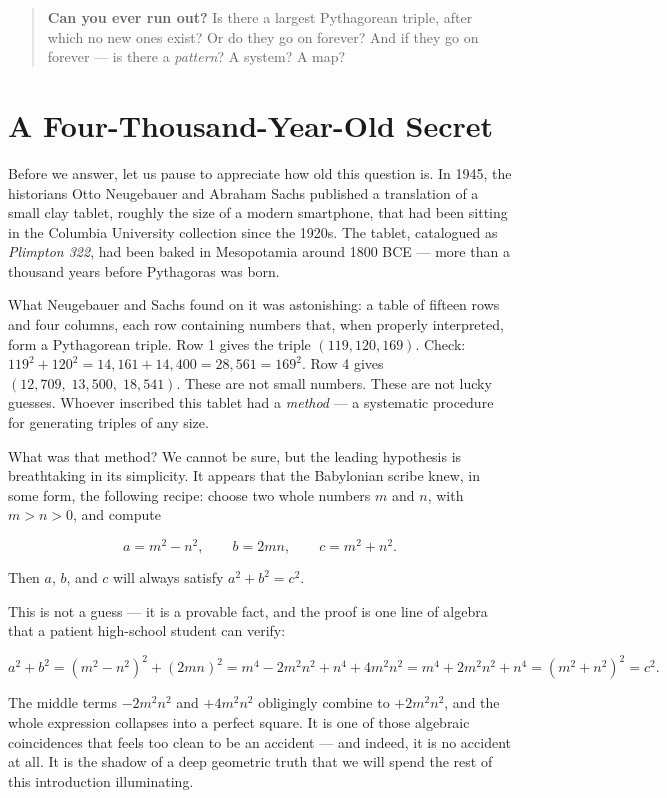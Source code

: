 \begin{quote}
\textbf{Can you ever run out?} Is there a largest Pythagorean triple, after which no new ones exist? Or do they go on forever? And if they go on forever --- is there a \emph{pattern}? A system? A map?
\end{quote}



\section{A Four-Thousand-Year-Old Secret}\label{intro-a-four-thousand-year-old-secret}

Before we answer, let us pause to appreciate how old this question is. In 1945, the historians Otto Neugebauer and Abraham Sachs published a translation of a small clay tablet, roughly the size of a modern smartphone, that had been sitting in the Columbia University collection since the 1920s. The tablet, catalogued as \emph{Plimpton 322}, had been baked in Mesopotamia around 1800 BCE --- more than a thousand years before Pythagoras was born.

What Neugebauer and Sachs found on it was astonishing: a table of fifteen rows and four columns, each row containing numbers that, when properly interpreted, form a Pythagorean triple. Row 1 gives the triple \((119, 120, 169)\). Check: \(119^2 + 120^2 = 14{,}161 + 14{,}400 = 28{,}561 = 169^2\). Row 4 gives \((12{,}709,\; 13{,}500,\; 18{,}541)\). These are not small numbers. These are not lucky guesses. Whoever inscribed this tablet had a \emph{method} --- a systematic procedure for generating triples of any size.

What was that method? We cannot be sure, but the leading hypothesis is breathtaking in its simplicity. It appears that the Babylonian scribe knew, in some form, the following recipe: choose two whole numbers \(m\) and \(n\), with \(m > n > 0\), and compute

\[a = m^2 - n^2, \qquad b = 2mn, \qquad c = m^2 + n^2.\]

Then \(a\), \(b\), and \(c\) will always satisfy \(a^2 + b^2 = c^2\).

This is not a guess --- it is a provable fact, and the proof is one line of algebra that a patient high-school student can verify:

\[a^2 + b^2 = (m^2 - n^2)^2 + (2mn)^2 = m^4 - 2m^2 n^2 + n^4 + 4m^2 n^2 = m^4 + 2m^2 n^2 + n^4 = (m^2 + n^2)^2 = c^2.\]

The middle terms \(-2m^2 n^2\) and \(+4m^2 n^2\) obligingly combine to \(+2m^2 n^2\), and the whole expression collapses into a perfect square. It is one of those algebraic coincidences that feels too clean to be an accident --- and indeed, it is no accident at all. It is the shadow of a deep geometric truth that we will spend the rest of this introduction illuminating.

